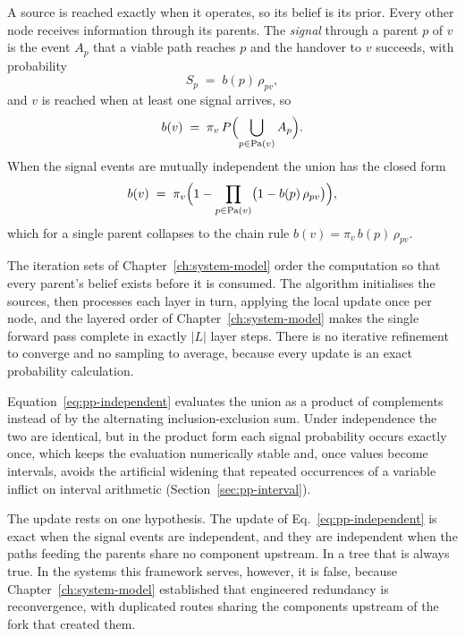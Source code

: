 \documentclass[12pt]{report}
\begin{document}
A source is reached exactly when it operates, so its belief is its prior. Every other node receives information through its parents. The \emph{signal} through a parent $p$ of $v$ is the event $A_p$ that a viable path reaches $p$ and the handover to $v$ succeeds, with probability
\begin{equation}
\label{eq:pp-signal}
S_p \;=\; b(p)\,\rho_{pv},
\end{equation}
and $v$ is reached when at least one signal arrives, so
\begin{equation}
\label{eq:pp-union}
b(v) \;=\; \pi_v \, P\Bigl(\bigcup_{p \in \mathrm{Pa}(v)} A_p\Bigr).
\end{equation}
When the signal events are mutually independent the union has the closed form
\begin{equation}
\label{eq:pp-independent}
b(v) \;=\; \pi_v \Bigl( 1 - \prod_{p \in \mathrm{Pa}(v)} \bigl( 1 - b(p)\,\rho_{pv} \bigr) \Bigr),
\end{equation}
which for a single parent collapses to the chain rule $b(v) = \pi_v\, b(p)\, \rho_{pv}$.

The iteration sets of Chapter~\ref{ch:system-model} order the computation so that every parent's belief exists before it is consumed. The algorithm initialises the sources, then processes each layer in turn, applying the local update once per node, and the layered order of Chapter~\ref{ch:system-model} makes the single forward pass complete in exactly $|L|$ layer steps. There is no iterative refinement to converge and no sampling to average, because every update is an exact probability calculation.

Equation~\eqref{eq:pp-independent} evaluates the union as a product of complements instead of by the alternating inclusion-exclusion sum. Under independence the two are identical, but in the product form each signal probability occurs exactly once, which keeps the evaluation numerically stable and, once values become intervals, avoids the artificial widening that repeated occurrences of a variable inflict on interval arithmetic (Section~\ref{sec:pp-interval}).

The update rests on one hypothesis. The update of Eq.~\eqref{eq:pp-independent} is exact when the signal events are independent, and they are independent when the paths feeding the parents share no component upstream. In a tree that is always true. In the systems this framework serves, however, it is false, because Chapter~\ref{ch:system-model} established that engineered redundancy is reconvergence, with duplicated routes sharing the components upstream of the fork that created them.
\end{document}
